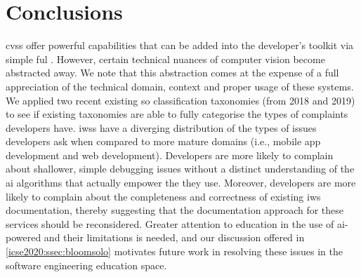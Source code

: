\section{Conclusions}
\label{icse2020:sec:conclusions}

\Glspl{cvs} offer powerful capabilities that can be added into the developer's toolkit via simple ful . However, certain technical nuances of computer vision become abstracted away. We note that this abstraction comes at the expense of a full appreciation of the technical domain, context and proper usage of these systems. We applied two recent existing \gls{so} classification taxonomies (from 2018 and 2019) to see if existing taxonomies are able to fully categorise the types of complaints developers have. \Glspl{iws} have a diverging distribution of the types of issues developers ask when compared to more mature domains (i.e., mobile app development and web development). Developers are more likely to complain about shallower, simple debugging issues without a distinct understanding of the \gls{ai} algorithms that actually empower the  they use. Moreover, developers are more likely to complain about the completeness and correctness of existing \gls{iws} documentation, thereby suggesting that the documentation approach for these services should be reconsidered. Greater attention to education in the use of \gls{ai}-powered  and their limitations is needed, and our discussion offered in \cref{icse2020:ssec:bloomsolo} motivates future work in resolving these issues in the software engineering education space.
